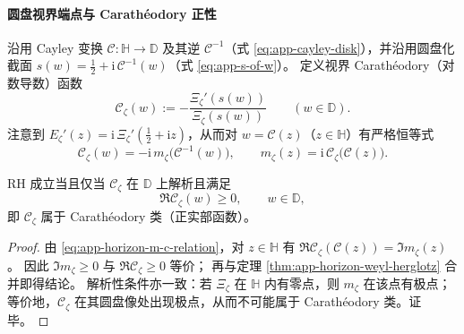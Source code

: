 \paragraph{圆盘视界端点与 Carath\'eodory 正性}
沿用 Cayley 变换 \(\mathcal{C}:\mathbb{H}\to\mathbb{D}\) 及其逆 \(\mathcal{C}^{-1}\)（式 \eqref{eq:app-cayley-disk}），并沿用圆盘化截面 \(s(w)=\tfrac12+\mathrm{i}\,\mathcal{C}^{-1}(w)\)（式 \eqref{eq:app-s-of-w}）。
定义视界 Carath\'eodory（对数导数）函数
\begin{equation}\label{eq:app-horizon-carath-def}
\boxed{\;
\mathscr{C}_{\zeta}(w):=-\frac{\Xi_{\zeta}'(s(w))}{\Xi_{\zeta}(s(w))}\qquad(w\in\mathbb{D}).\;}
\end{equation}
注意到 \(E_{\zeta}'(z)=\mathrm{i}\,\Xi_{\zeta}'(\tfrac12+\mathrm{i}z)\)，从而对 \(w=\mathcal{C}(z)\)（\(z\in\mathbb{H}\)）有严格恒等式
\begin{equation}\label{eq:app-horizon-m-c-relation}
\boxed{\;
\mathscr{C}_{\zeta}(w)=-\mathrm{i}\,m_{\zeta}\!\bigl(\mathcal{C}^{-1}(w)\bigr),\qquad
m_{\zeta}(z)=\mathrm{i}\,\mathscr{C}_{\zeta}\!\bigl(\mathcal{C}(z)\bigr).\;}
\end{equation}

\begin{corollary}[RH 的圆盘正性形式]\label{cor:app-horizon-carath-rh}
RH 成立当且仅当 \(\mathscr{C}_{\zeta}\) 在 \(\mathbb{D}\) 上解析且满足
\[
\Re \mathscr{C}_{\zeta}(w)\ge 0,\qquad w\in\mathbb{D},
\]
即 \(\mathscr{C}_{\zeta}\) 属于 Carath\'eodory 类（正实部函数）。
\end{corollary}

\begin{proof}
由 \eqref{eq:app-horizon-m-c-relation}，对 \(z\in\mathbb{H}\) 有
\(\Re \mathscr{C}_{\zeta}(\mathcal{C}(z))=\Im m_{\zeta}(z)\)。
因此 \(\Im m_{\zeta}\ge 0\) 与 \(\Re\mathscr{C}_{\zeta}\ge 0\) 等价；
再与定理 \ref{thm:app-horizon-weyl-herglotz} 合并即得结论。
解析性条件亦一致：若 \(\Xi_{\zeta}\) 在 \(\mathbb{H}\) 内有零点，则 \(m_{\zeta}\) 在该点有极点；等价地，\(\mathscr{C}_{\zeta}\) 在其圆盘像处出现极点，从而不可能属于 Carath\'eodory 类。证毕。
\end{proof}

